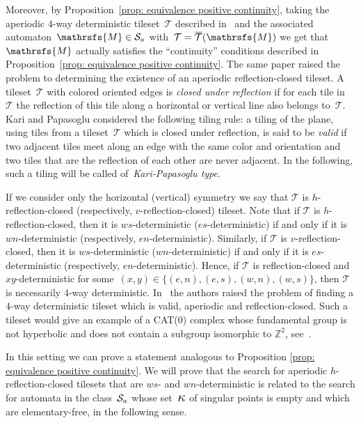 \documentclass{amsart}
\begin{document}
{Moreover, by Proposition~\ref{prop: equivalence positive continuity},
taking the aperiodic $4$-way deterministic tileset~$\mathcal{T}$
described in~\cite{KaPa} and the associated 
automaton~${{{\mathrsfs{{M}}}}}\in{\hbox{${\mathcal S}_{a}$}}$ with~$\mathcal{T}=\overline{\mathcal{T}}({{{\mathrsfs{{M}}}}})$
we get that ${{{\mathrsfs{{M}}}}}$ actually satisfies the ``continuity'' conditions
described in Proposition~\ref{prop: equivalence positive
  continuity}. The same paper raised the problem to determining
the existence of an aperiodic reflection-closed tileset.
A tileset~$\mathcal{T}$ with colored oriented edges is \emph{closed under reflection}
if for each tile in~$\mathcal{T}$ the reflection of this tile along a
horizontal or vertical line also belongs to~$\mathcal{T}$. Kari and
Papasoglu considered the following tiling rule: a tiling of the plane,
using tiles from a tileset~$\mathcal{T}$ which is closed under
reflection, is said to be \emph{valid} if two adjacent tiles meet along an edge with the
same color and orientation and two tiles that are the reflection of
each other are never adjacent. In the following, such a tiling will be called of~\emph{Kari-Papasoglu type}.

If we consider only the horizontal
(vertical) symmetry we say that $\mathcal{T}$ is $h$-reflection-closed
(respectively, $v$-reflection-closed) tileset. Note that if
$\mathcal{T}$ is $h$-reflection-closed, then it is $ws$-deterministic
($es$-deterministic) if and only if it is $wn$-deterministic
(respectively, $en$-deterministic). Similarly, if $\mathcal{T}$ is
$v$-reflection-closed, then it is $ws$-deterministic
($wn$-deterministic) if and only if it is $es$-deterministic
(respectively, $en$-deterministic). Hence, if $\mathcal{T}$ is reflection-closed and $xy$-deterministic for some~$(x,y)\in\{(e,n),(e,s),(w,n),(w,s)\}$, then $\mathcal{T}$ is necessarily $4$-way deterministic. In~\cite{KaPa} the authors raised the problem of finding a $4$-way deterministic tileset which is valid, aperiodic and reflection-closed. Such a tileset would give an example of a CAT(0) complex whose fundamental group is not hyperbolic and does not contain a subgroup isomorphic to $\mathbb{Z}^{2}$, see~\cite{Gromov, KaPa}.\medskip
 
In this setting we can prove a statement analogous to Proposition \ref{prop: equivalence positive continuity}. We will prove that the search for aperiodic
$h$-reflection-closed tilesets that are $ws$- and $wn$-deterministic
is related to the search for 
automata in the class~${\hbox{${\mathcal S}_{a}$}}$ whose set~${\hbox{\Large{$\kappa$}}}$ of singular points is empty
and which are elementary-free, in the following sense. \\ 

}
\end{document}
